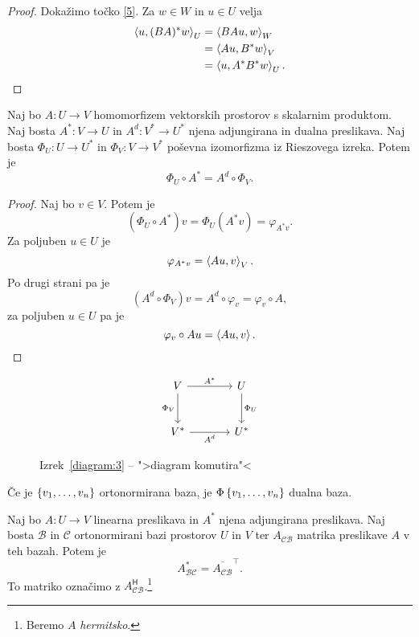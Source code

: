 \documentclass[12pt, a4paper]{article}
\begin{document}
\begin{proof}
Dokažimo točko \ref{5}. Za $w\in W$ in $u\in U$ velja
\begin{align*}
\left\langle u,(BA)^*w\right\rangle_U&=\left\langle BAu,w\right\rangle_W
\\
&=\left\langle Au,B^*w\right\rangle_V
\\
&=\left\langle u,A^*B^*w\right\rangle_U.\qedhere
\end{align*}
\end{proof}

\begin{izrek}\label{diagram:3}
Naj bo $A\colon U\to V$ homomorfizem vektorskih prostorov s skalarnim produktom. Naj bosta $A^*\colon V\to U$ in $A^d\colon V^*\to U^*$ njena adjungirana in dualna preslikava. Naj bosta $\Phi_U\colon U\to U^*$ in $\Phi_V\colon V\to V^*$ poševna izomorfizma iz Rieszovega izreka. Potem je
\[
\Phi_U\circ A^*=A^d\circ \Phi_V.
\]
\end{izrek}

\begin{proof}
Naj bo $v\in V$. Potem je
\[
\left(\Phi_U\circ A^*\right)v=\Phi_U\left(A^*v\right)=\varphi_{A^*v}.
\]
Za poljuben $u\in U$ je
\[
\varphi_{A^*v}=\left\langle Au,v\right\rangle_V.
\]
Po drugi strani pa je
\[
\left(A^d\circ \Phi_V\right)v=A^d\circ\varphi_v=\varphi_v\circ A,
\]
za poljuben $u\in U$ pa je
\[
\varphi_v\circ Au=\left\langle Au,v\right\rangle.\qedhere
\]
\end{proof}

\begin{figure}[H]
\[
\begin{tikzcd}[column sep=large, row sep=large]
V
\arrow[r, "A^*"]
\arrow[d, "\Phi_V"'] & U \arrow[d, "\Phi_U"] \\
V^* \arrow[r, "A^d"'] & U^*
\end{tikzcd}
\]
\caption{Izrek~\ref{diagram:3} -- ">diagram komutira"<}
\end{figure}

\begin{trditev}
Če je $\left\{v_1,\dots,v_n\right\}$ ortonormirana baza, je $\Phi\left\{v_1,\dots,v_n\right\}$ dualna baza.
\end{trditev}

\obvs

\begin{izrek}
Naj bo $A\colon U\to V$ linearna preslikava in $A^*$ njena adjungirana preslikava. Naj bosta $\mathcal{B}$ in $\mathcal{C}$ ortonormirani bazi prostorov $U$ in $V$ ter $A_{\mathcal{CB}}$ matrika preslikave $A$ v teh bazah. Potem je
\[
A^*_{\mathcal{BC}}=\overline{A_{\mathcal{CB}}}^\top.
\]
To matriko označimo z $A_{\mathcal{CB}}^{\mathsf{H}}$.\footnote{Beremo $A$ \emph{hermitsko}.}
\end{izrek}
\end{document}
